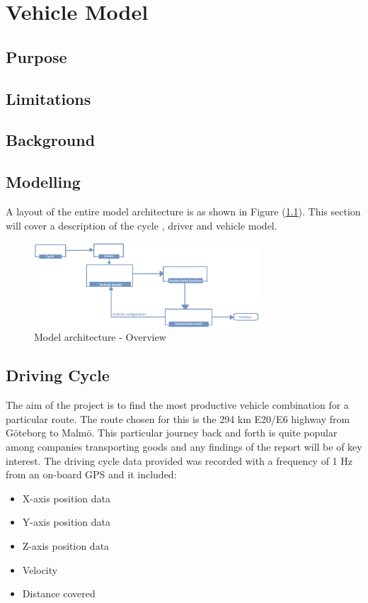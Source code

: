\documentclass[ExampleMasters.tex]{subfiles}
\begin{document}
\chapter{Vehicle Model}
\lipsum

\section{Purpose}
\lipsum

\section{Limitations}
\lipsum

\section{Background}
\lipsum

\section{Modelling}
A layout of the entire model architecture is as shown in Figure (\ref{fig:architecture}). This section will cover a description of the cycle , driver and vehicle model. 

\begin{figure}[ht]
	\begin{center}
		\includegraphics[width=0.75\textwidth]{figures/VehicleModel/architecture2.png}
	\end{center}
	\caption{Model architecture - Overview}
	\label{fig:architecture}
\end{figure}

\section{Driving Cycle}
\label{sec:drivingcycle}
The aim of the project is to find the most productive vehicle combination for a particular route. The route chosen for this is the 294 km E20/E6 highway from G\"oteborg to Malm\"o. This particular journey back and forth is quite popular among companies transporting goods and any findings of the report will be of key interest. 
The driving cycle data provided was recorded with a frequency of 1 Hz from an on-board GPS and it included:
\begin{itemize}
\item X-axis position data
\item Y-axis position data
\item Z-axis position data
\item Velocity
\item Distance covered
\end{itemize}
\end{document}
